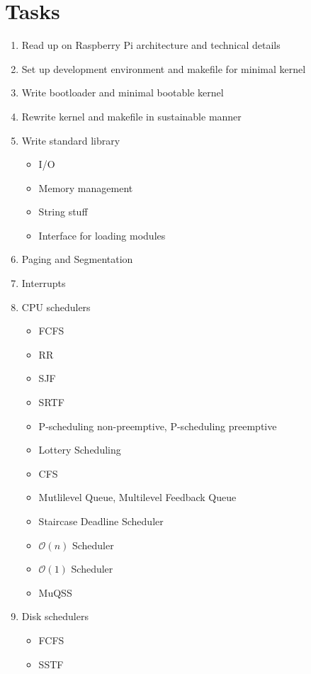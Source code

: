 \documentclass[10pt, a4paper]{article}
\begin{document}
\section{Tasks}
\begin{enumerate}
    \item Read up on Raspberry Pi architecture and technical details
    \item Set up development environment and makefile for minimal kernel
    \item Write bootloader and minimal bootable kernel
    \item Rewrite kernel and makefile in sustainable manner
    \item Write standard library
        \begin{itemize}
            \item I/O
            \item Memory management
            \item String stuff
            \item Interface for loading modules
        \end{itemize}
    \item Paging and Segmentation
    \item Interrupts
    \item CPU schedulers
        \begin{itemize}
            \item FCFS
            \item RR
            \item SJF
            \item SRTF
            \item P-scheduling non-preemptive, P-scheduling preemptive
            \item Lottery Scheduling
            \item CFS
            \item Mutlilevel Queue, Multilevel Feedback Queue
            \item Staircase Deadline Scheduler
            \item $\mathcal{O}(n)$ Scheduler
            \item $\mathcal{O}(1)$ Scheduler
            \item MuQSS
        \end{itemize}
    \item Disk schedulers
        \begin{itemize}
            \item FCFS
            \item SSTF

\end{itemize}
\end{enumerate}
\end{document}
